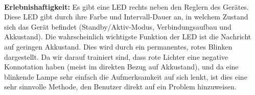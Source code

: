 \documentclass[a4paper,10pt]{article}
\begin{document}
\\
\textbf{Erlebnishaftigkeit:} Es gibt eine LED rechts neben den Reglern des Gerätes. Diese LED gibt durch ihre Farbe und Intervall-Dauer an, in welchem Zustand sich das Gerät befindet (Standby/Aktiv-Modus, Verbindungsaufbau und Akkustand). Die wahrscheinlich wichtigste Funktion der LED ist die Nachricht auf geringen Akkustand. Dies wird durch ein permanentes, rotes Blinken dargestellt. Da wir darauf trainiert sind, dass rote Lichter eine negative Konnotation haben (meist im direkten Bezug auf Akkustand), und da eine blinkende Lampe sehr einfach die Aufmerksamkeit auf sich lenkt, ist dies eine sehr sinnvolle Methode, den Benutzer direkt auf ein Problem hinzuweisen.
\end{document}

